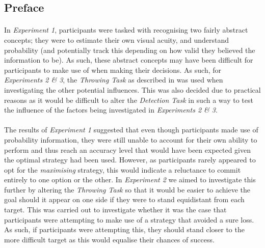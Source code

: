 \documentclass[12pt]{article}
\begin{document}
\subsection*{Preface}
\paragraph{} In \textit{Experiment 1}, participants were tasked with recognising two fairly abstract concepts; they were to estimate their own visual acuity, and understand probability (and potentially track this depending on how valid they believed the information to be). As such, these abstract concepts may have been difficult for participants to make use of when making their decisions. As such, for \textit{Experiments 2 \& 3}, the \textit{Throwing Task} as described in \cite{clarke2015failure} was used when investigating the other potential influences. This was also decided due to practical reasons as it would be difficult to alter the \textit{Detection Task} in such a way to test the influence of the factors being investigated in \textit{Experiments 2 \& 3}. 

\paragraph{} The results of \textit{Experiment 1} suggested that even though participants made use of probability information, they were still unable to account for their own ability to perform and thus reach an accuracy level that would have been expected given the optimal strategy had been used. However, as participants rarely appeared to opt for the \textit{maximising} strategy, this would indicate a reluctance to commit entirely to one option or the other. In \textit{Experiment 2} we aimed to investigate this further by altering the \textit{Throwing Task} \citep{clarke2015failure} so that it would be easier to achieve the goal should it appear on one side if they were to stand equidistant from each target. This was carried out to investigate whether it was the case that participants were attempting to make use of a strategy that avoided a sure loss. As such, if participants were attempting this, they should stand closer to the more difficult target as this would equalise their chances of success. 
 
 
 
\end{document}
